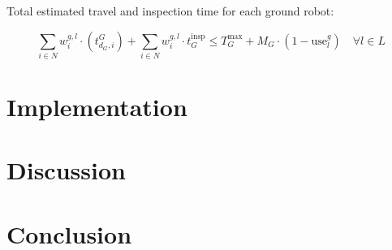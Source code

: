 \documentclass{article}
\begin{document}
				Total estimated travel and inspection time for each ground robot:

				\begin{equation}
					\sum_{i \in N} w_i^{g,l} \cdot \left( t_{d_G,i}^{G}\right) + \sum_{i \in N} w_i^{g,l} \cdot t_G^{\text{insp}} \leq T_G^{\max} + M_G \cdot (1 - \text{use}_l^g) \quad \forall l \in L
				\end{equation}


	\section{Implementation}

	\section{Discussion}

	\section{Conclusion}

	\newpage
	
	\nocite{*}
	
\end{document}
